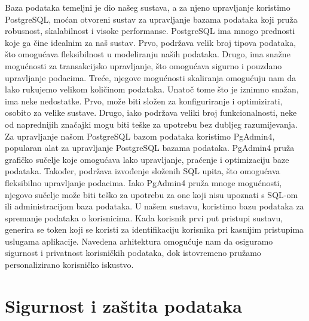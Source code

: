 \documentclass[times, utf8, zavrsni]{fer}
\begin{document}
Baza podataka temeljni je dio našeg sustava, a za njeno upravljanje koristimo PostgreSQL, moćan otvoreni sustav za upravljanje bazama podataka koji pruža robusnost, skalabilnost i visoke performanse. PostgreSQL ima mnogo prednosti koje ga čine idealnim za naš sustav. Prvo, podržava velik broj tipova podataka, što omogućava fleksibilnost u modeliranju naših podataka. Drugo, ima snažne mogućnosti za transakcijsko upravljanje, što omogućava sigurno i pouzdano upravljanje podacima. Treće, njegove mogućnosti skaliranja omogućuju nam da lako rukujemo velikom količinom podataka. Unatoč tome što je iznimno snažan, ima neke nedostatke. Prvo, može biti složen za konfiguriranje i optimizirati, osobito za velike sustave. Drugo, iako podržava veliki broj funkcionalnosti, neke od naprednijih značajki mogu biti teške za upotrebu bez dubljeg razumijevanja. Za upravljanje našom PostgreSQL bazom podataka koristimo PgAdmin4, popularan alat za upravljanje PostgreSQL bazama podataka. PgAdmin4 pruža grafičko sučelje koje omogućava lako upravljanje, praćenje i optimizaciju baze podataka. Također, podržava izvođenje složenih SQL upita, što omogućava fleksibilno upravljanje podacima. Iako PgAdmin4 pruža mnoge mogućnosti, njegovo sučelje može biti teško za upotrebu za one koji nisu upoznati s SQL-om ili administracijom baza podataka. U našem sustavu, koristimo bazu podataka za spremanje podataka o korisnicima. Kada korisnik prvi put pristupi sustavu, generira se token koji se koristi za identifikaciju korisnika pri kasnijim pristupima uslugama aplikacije. Navedena arhitektura omogućuje nam da osiguramo sigurnost i privatnost korisničkih podataka, dok istovremeno pružamo personalizirano korisničko iskustvo.

\section{Sigurnost i zaštita podataka}
\end{document}
